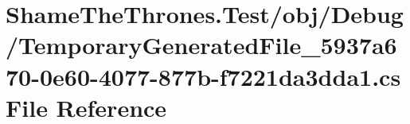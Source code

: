 \hypertarget{_test_2obj_2_debug_2_temporary_generated_file__5937a670-0e60-4077-877b-f7221da3dda1_8cs}{}\section{Shame\+The\+Thrones.\+Test/obj/\+Debug/\+Temporary\+Generated\+File\+\_\+5937a670-\/0e60-\/4077-\/877b-\/f7221da3dda1.cs File Reference}
\label{_test_2obj_2_debug_2_temporary_generated_file__5937a670-0e60-4077-877b-f7221da3dda1_8cs}
